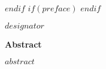 \documentclass[12pt,letterpaper,toc=flat,oneside]{book}
\begin{document}
 \def\ackhead{\chapter*{Acknowledgements}
  \addcontentsline{toc}{chapter}{Acknowledgements}
  \addtocontents{toc}{\protect\addvspace{10\p@}}
 }
 \def\acktail{\par \null\vspace*{.75in}\hspace*{3in} \@author \newpage} 
$endif$
$if(preface)$
\newenvironment{preface}{
\chapter*{Preface}     
\addcontentsline{toc}{chapter}{Preface}
\addtocontents{toc}{\protect\addvspace{10\p@}}
}{}
$endif$
    \thispagestyle{plain}
    \noindent $designator$
    \begin{center}
	\large\bfseries Abstract
    \end{center}
    \vspace{2em}
    $abstract$
    \newpage
\renewcommand\contentsname{\hfill \bfseries\Large Table of Contents\hfill}
\tableofcontents
\newpage
\renewcommand\listtablename{\hfill \bfseries\Large List of Tables\hfill}
\listoftables
\newpage
\renewcommand\listfigurename{\hfill \bfseries\Large List of Figures\hfill}
\listoffigures
\newpage
\date{$date$}
\end{document}
